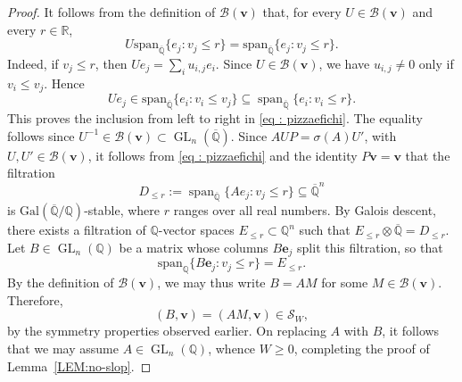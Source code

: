 \documentclass[a4paper,11pt, twoside,reqno]{amsart}
\theoremstyle{plain}
\theoremstyle{definition}
\theoremstyle{remark}
\newcommand{\Gal}{\mathrm{Gal}}
\newcommand{\bfe}{\bm{e}}
\newcommand{\bfv}{\bm{v}}
\newcommand{\QQ}{\mathbb{Q}}
\DeclareMathOperator{\GL}{GL}
\renewcommand{\le}{\leqslant}
\renewcommand{\leq}{\leqslant}
\renewcommand{\ge}{\geqslant}
\newcommand{\Qbar}{\overline{\mathbb{Q}}}
\numberwithin{equation}{section}
\begin{document}
\begin{proof}
It follows from the definition of $\mathcal{B}(\bfv)$ that, for every
$U\in\mathcal{B}(\bfv)$ and every $r\in\mathbb{R}$,
\begin{equation}
U\text{span}_{\Qbar}\{e_j:v_j\leq r\}=\text{span}_{\Qbar}\{e_j:v_j\leq r\}.
\label{eq : pizzaefichi}
\end{equation}
Indeed, if $v_j\leq r$, then $Ue_j=\sum_i u_{i,j}e_i$. Since $U\in\mathcal{B}(\bfv)$, we have $u_{i,j}\neq 0$ only if $v_i\leq v_j$. Hence
\[
Ue_j\in\text{span}_{\Qbar}\{e_i:v_i\leq v_j\}
\subseteq\operatorname{span}_{\Qbar}\{e_i:v_i\leq r\}.
\]
This proves the inclusion from left to right in \eqref{eq : pizzaefichi}.
The equality follows since $U^{-1}\in \mathcal{B}(\bfv)\subset\GL_{n}(\Qbar)$.
Since $AUP=\sigma(A)U'$, with $U,U'\in\mathcal{B}(\bfv)$, it follows from \eqref{eq : pizzaefichi} and the identity $P\bfv=\bfv$ that the filtration
\[
D_{\le r}:=\operatorname{span}_{\Qbar}\{Ae_j:v_j\leq r\}\subseteq\Qbar^n
\]
is $\Gal(\Qbar/\QQ)$-stable, where $r$ ranges over all real numbers.
 By Galois descent, there exists a filtration of $\QQ$-vector spaces
$E_{\le r} \subset \QQ^n$
such that $E_{\le r} \otimes \Qbar = D_{\le r}$.
Let $B\in \GL_n(\QQ)$ be a matrix whose columns $B\bfe_j$ split this filtration,
so that
$$\mathrm{span}_{\QQ}\{B\bfe_j: v_j\le r\} = E_{\le r}.$$
By the definition of $\mathcal{B}(\bfv)$,
we may thus write $B = AM$ for some $M\in \mathcal{B}(\bfv)$.
Therefore,
$$(B,\bfv)=(AM,\bfv) \in \mathcal{S}_W,$$
by the symmetry properties observed earlier.
On replacing $A$ with $B$,
it follows that we may assume $A\in \GL_n(\QQ)$,
whence $W \ge 0$,
completing the proof of Lemma~\ref{LEM:no-slop}.
\end{proof}
\end{document}
